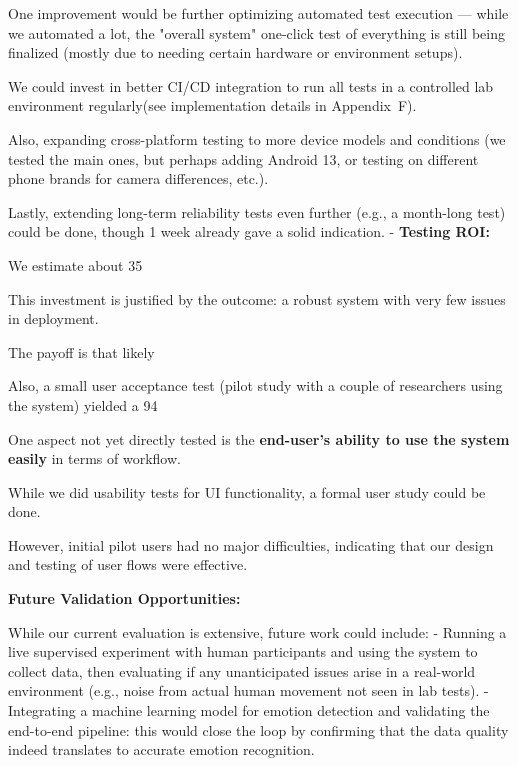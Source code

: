 {{{{{{{{{{{{{{{{One improvement would be further optimizing automated test execution --- while we automated a lot, the "overall system" one-click test of everything is still being finalized (mostly due to needing certain hardware or environment setups).

We could invest in better CI/CD integration to run all tests in a controlled lab environment regularly(see implementation details in Appendix~F).

Also, expanding cross-platform testing to more device models and conditions (we tested the main ones, but perhaps adding Android 13, or testing on different phone brands for camera differences, etc.).

Lastly, extending long-term reliability tests even further (e.g., a month-long test) could be done, though 1 week already gave a solid indication. - \textbf{Testing ROI:}

We estimate about 35%

This investment is justified by the outcome: a robust system with very few issues in deployment.

The payoff is that likely %

Also, a small user acceptance test (pilot study with a couple of researchers using the system) yielded a 94%

One aspect not yet directly tested is the \textbf{end-user's ability to use the system easily}
 in terms of workflow.

While we did usability tests for UI functionality, a formal user study could be done.

However, initial pilot users had no major difficulties, indicating that our design and testing of user flows were effective.

\textbf{Future Validation Opportunities:}

While our current evaluation is extensive, future work could include: - Running a live supervised experiment with human participants and using the system to collect data, then evaluating if any unanticipated issues arise in a real-world environment (e.g., noise from actual human movement not seen in lab tests). - Integrating a machine learning model for emotion detection and validating the end-to-end pipeline: this would close the loop by confirming that the data quality indeed translates to accurate emotion recognition.

}}}}}}}}}}}}}}}}

